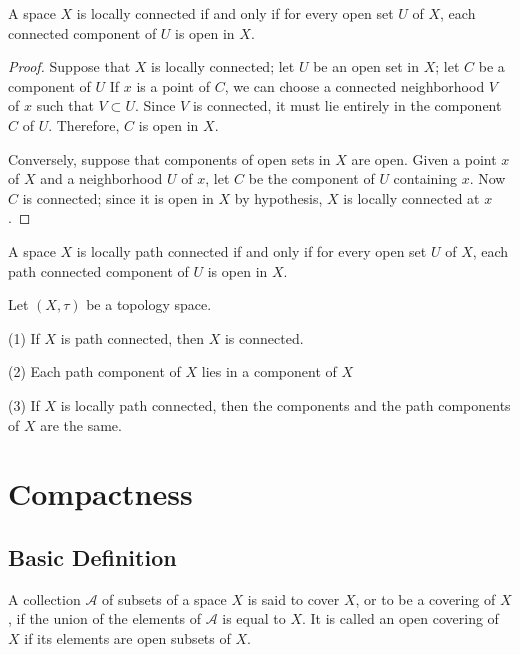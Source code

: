 \documentclass[12pt, a4paper, oneside]{book}
\begin{document}
\begin{theorem}
    A space $X$ is locally connected if and only if for every open set $U$ of $X$, each connected component of $U$ is open in $X$.

    \begin{proof}
        Suppose that $X$ is locally connected; let $U$ be an open set in $X$; let $C$ be a component of $U$ If $x$ is a point of $C$, we can choose a connected neighborhood $V$ of $x$ such that $V \subset U$. Since $V$ is connected, it must lie entirely in the component $C$ of $U$. Therefore, $C$ is open in $X$.

        Conversely, suppose that components of open sets in $X$ are open. Given a point $x$ of $X$ and a neighborhood $U$ of $x$, let $C$ be the component of $U$ containing $x$. Now $C$ is connected; since it is open in $X$ by hypothesis, $X$ is locally connected at $x$.
    \end{proof}
\end{theorem}


\begin{theorem}
    A space $X$ is locally path connected if and only if for every open set $U$ of $X$, each path connected component of $U$ is open in $X$.
\end{theorem}

\begin{theorem}
    Let $\left(X, \tau\right)$ be a topology space.

    (1) If $X$ is path connected, then $X$ is connected.

    (2) Each path component of $X$ lies in a component of $X$

    (3) If $X$ is locally path connected, then the components and the path components of $X$ are the same.
\end{theorem}


\chapter{Compactness}
\section{Basic Definition} %
\begin{definition}
    A collection $\mathcal{A}$ of subsets of a space $X$ is said to cover $X$, or to be a covering of $X$, if the union of the elements of $\mathcal{A}$ is equal to $X$. It is called an open covering of $X$ if its elements are open subsets of $X$.
\end{definition}
\end{document}
